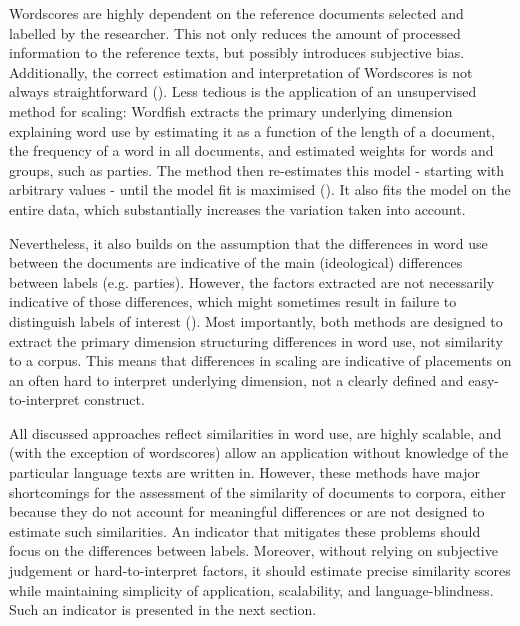 \documentclass{article}
\begin{document}
Wordscores are highly dependent on the reference documents selected and labelled by the researcher. This not only reduces the amount of processed information to the reference texts, but possibly introduces subjective bias. Additionally, the correct estimation and interpretation of Wordscores is not always straightforward (\cite{Lowe2008}). Less tedious is the application of an unsupervised method for scaling: Wordfish extracts the primary underlying dimension explaining word use by estimating it as a function of the length of a document, the frequency of a word in all documents, and estimated weights for words and groups, such as parties. The method then re-estimates this model - starting with arbitrary values - until the model fit is maximised (\cite{Slapin2008}). It also fits the model on the entire data, which substantially increases the variation taken into account.\par

Nevertheless, it also builds on the assumption that the differences in word use between the documents are indicative of the main (ideological) differences between labels (e.g. parties). However, the factors extracted are not necessarily indicative of those differences, which might sometimes result in failure to distinguish labels of interest (\cite[292f]{Grimmer2013TextASData}). Most importantly, both methods are designed to extract the primary dimension structuring differences in word use, not similarity to a corpus. This means that differences in scaling are indicative of placements on an often hard to interpret underlying dimension, not a clearly defined and easy-to-interpret construct.\par

All discussed approaches reflect similarities in word use, are highly scalable, and (with the exception of wordscores) allow an application without knowledge of the particular language texts are written in. However, these methods have major shortcomings for the assessment of the similarity of documents to corpora, either because they do not account for meaningful differences or are not designed to estimate such similarities. An indicator that mitigates these problems should focus on the differences between labels. Moreover, without relying on subjective judgement or hard-to-interpret factors, it should estimate precise similarity scores while maintaining simplicity of application, scalability, and language-blindness. Such an indicator is presented in the next section.\par
\end{document}
